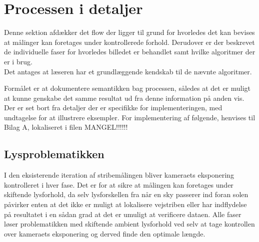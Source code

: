 \section{Processen i detaljer\label{ref::process}}

Denne sektion afdækker det flow der ligger til grund for hvorledes det kan bevises at målinger kan foretages under kontrollerede forhold. Derudover er der beskrevet de individuelle faser for hvorledes billedet er behandlet samt hvilke algoritmer der er i brug.\\Det antages at læseren har et grundlæggende kendskab til de nævnte algoritmer.

Formålet er at dokumentere semantikken bag processen, således at det er muligt at kunne genskabe det samme resultat ud fra denne information på anden vis.\\
Der er set bort fra detaljer der er specifikke for implementeringen, med undtagelse for at illustrere eksempler.
For implementering af følgende, henvises til Bilag A, lokaliseret i filen MANGEL!!!!!! 

\subsection{Lysproblematikken}
I den eksisterende iteration af stribemålingen bliver kameraets eksponering kontrolleret i hver fase. Det er for at sikre at målingen kan foretages under skiftende lysforhold, da selv lysforskellen fra når en sky passerer ind foran solen påvirker enten at det ikke er muligt at lokalisere vejstriben eller har indflydelse på resultatet i en sådan grad at det er umuligt at verificere dataen.
Alle faser løser problematikken med skiftende ambient lysforhold ved selv at tage kontrollen over kameraets eksponering og derved finde den optimale længde.\\

